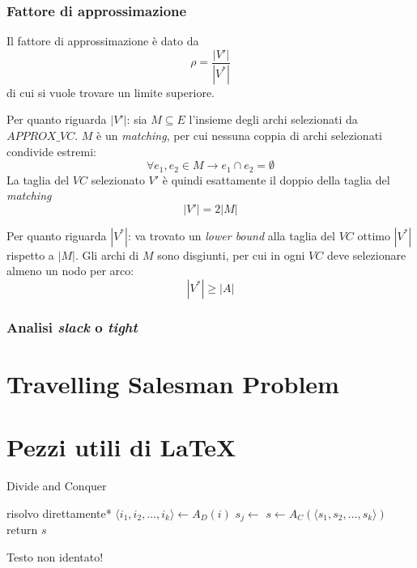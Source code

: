 \subsubsection{Fattore di approssimazione}
Il fattore di approssimazione è dato da
\begin{equation*}
    \rho = \frac{
    |V'|
    }{
    |V^*|
    }
\end{equation*}
di cui si vuole trovare un limite superiore.

Per quanto riguarda $|V'|$:
sia $M \subseteq E$ l'insieme degli archi selezionati da $APPROX\_VC$.
$M$ è un \emph{matching}, per cui nessuna coppia di archi selezionati condivide estremi:
\begin{equation*}
    \forall e_1, e_2 \in M
    \to
    e_1 \cap e_2 = \emptyset
\end{equation*}
La taglia del $VC$ selezionato $V'$ è quindi esattamente il doppio della taglia del \emph{matching}
\begin{equation*}
    |V'| = 2 |M|
\end{equation*}

Per quanto riguarda $|V^*|$:
va trovato un \emph{lower bound} alla taglia del $VC$ ottimo $
|V^*|
$ rispetto a $|M|$.
Gli archi di $M$ sono disgiunti, per cui in ogni $VC$ deve selezionare almeno un nodo per arco:
\begin{equation*}
    |V^*| \geq |A|
\end{equation*}

\subsubsection{Analisi \emph{slack} o \emph{tight}}

\section{Travelling Salesman Problem}

\section{Pezzi utili di \LaTeX{}}
\begin{algorithm}[H]
\caption{Divide and Conquer}\label{alg:dnc}
\begin{algorithmic}[1]
            \State *risolvo direttamente*
        \EndIf
        \State $\langle i_1, i_2, \dots, i_k \rangle \gets A_D(i)$ 
            \State $s_j \gets $ 
        \EndFor
        \State $s \gets A_C(\langle s_1, s_2, \dots, s_k \rangle)$
        \State return $s$
    \EndProcedure
\end{algorithmic}
\end{algorithm}
\noindent
Testo non identato!

